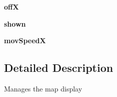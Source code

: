 \begin{DoxyCompactItemize}
\item 
\hypertarget{classinterface_1_1pgcli_1_1_map_view_ac37751b555c6edb2641826146155df6f}{{\bfseries off\-X}}\label{classinterface_1_1pgcli_1_1_map_view_ac37751b555c6edb2641826146155df6f}

\item 
\hypertarget{classinterface_1_1pgcli_1_1_map_view_a77187bc637bf5d75976fa6616971d83a}{{\bfseries shown}}\label{classinterface_1_1pgcli_1_1_map_view_a77187bc637bf5d75976fa6616971d83a}

\item 
\hypertarget{classinterface_1_1pgcli_1_1_map_view_a658edd9b7221a04a638f53a932bbe477}{{\bfseries mov\-Speed\-X}}\label{classinterface_1_1pgcli_1_1_map_view_a658edd9b7221a04a638f53a932bbe477}

\end{DoxyCompactItemize}


\subsection{\-Detailed \-Description}
\begin{DoxyVerb}Manages the map display \end{DoxyVerb}
 

